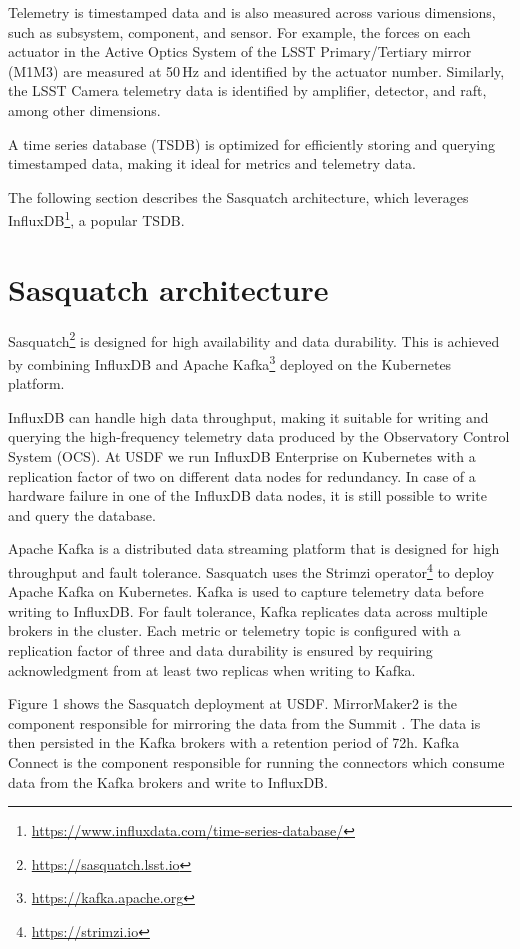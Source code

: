 Telemetry is timestamped data and is also measured across various dimensions, such as subsystem, component, and sensor. For example, the forces on each actuator in the Active Optics System of the LSST Primary/Tertiary mirror (M1M3) are measured at 50\,Hz and identified by the actuator number. Similarly, the LSST Camera telemetry data is identified by amplifier, detector, and raft, among other dimensions.

A time series database (TSDB) is optimized for efficiently storing and querying timestamped data, making it ideal for metrics and telemetry data.

The following section describes the Sasquatch architecture, which leverages InfluxDB\footnote{\url{https://www.influxdata.com/time-series-database/}}, a popular TSDB.

\section{Sasquatch architecture}
\label{sec:arch}

Sasquatch\footnote{\url{https://sasquatch.lsst.io}} is designed for high availability and data durability. This is achieved by combining InfluxDB and Apache Kafka\footnote{\url{https://kafka.apache.org}} deployed on the Kubernetes platform. \cite{SQR-029,SQR-068}

InfluxDB can handle high data throughput, making it suitable for writing and querying the high-frequency telemetry data produced by the Observatory Control System (OCS). At USDF we run InfluxDB Enterprise on Kubernetes with a replication factor of two on different data nodes for redundancy. In case of a hardware failure in one of the InfluxDB data nodes, it is still possible to write and query the database.

Apache Kafka is a distributed data streaming platform that is designed for high throughput and fault tolerance. Sasquatch uses the Strimzi operator\footnote{\url{https://strimzi.io}} to deploy Apache Kafka on Kubernetes. Kafka is used to capture telemetry data before writing to InfluxDB. For fault tolerance, Kafka replicates data across multiple brokers in the cluster. Each metric or telemetry topic is configured with a replication factor of three and data durability is ensured by requiring acknowledgment from at least two replicas when writing to Kafka.

Figure 1 shows the Sasquatch deployment at USDF. MirrorMaker2 is the component responsible for mirroring the data from the Summit \cite{SQR-050}. The data is then persisted in the Kafka brokers with a retention period of 72h. Kafka Connect is the component responsible for running the connectors which consume data from the Kafka brokers and write to InfluxDB.

